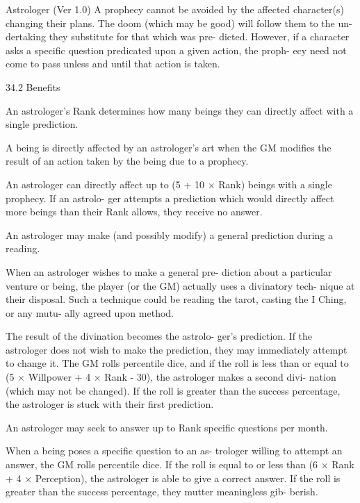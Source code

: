 \begin{Chapter}{Astrologer (Ver 1.0)}
A  prophecy  cannot  be  avoided  by  the  affected 
character(s)  changing 
their  plans.  The  doom 
(which  may  be  good)  will  follow  them  to  the  un-
dertaking  they  substitute  for  that  which  was  pre-
dicted.  However,  if  a  character  asks  a  specific 
question predicated upon a given action, the proph-
ecy  need  not  come  to  pass  unless  and  until  that 
action is taken. 

34.2 Benefits 

An  astrologer’s  Rank  determines  how  many 
beings  they  can  directly  affect  with  a  single 
prediction. 

A  being  is  directly  affected  by  an  astrologer’s  art 
when the GM modifies the result of an action taken 
by the being due to a prophecy. 

An  astrologer  can  directly  affect  up  to  (5  +  10  × 
Rank) beings with a single prophecy. If an astrolo-
ger  attempts  a  prediction  which  would  directly 
affect  more  beings  than  their  Rank  allows,  they 
receive no answer. 

An  astrologer  may  make  (and  possibly  modify) 
a general prediction during a reading. 

When an astrologer  wishes to make a general pre-
diction  about  a  particular  venture  or  being,  the 
player (or the GM) actually uses a divinatory tech-
nique  at  their  disposal.  Such  a  technique  could  be 
reading the tarot, casting the I Ching, or any mutu-
ally agreed upon method. 

The  result  of  the  divination  becomes  the  astrolo-
ger’s  prediction.  If  the  astrologer  does  not  wish to 
make the prediction, they may immediately attempt 
to  change  it.  The  GM  rolls  percentile  dice,  and  if 
the roll is less than or equal to (5 × Willpower + 4 
×  Rank  -  30),  the  astrologer  makes  a  second  divi-
nation  (which  may  not  be  changed).  If  the  roll  is 
greater  than  the  success  percentage,  the  astrologer 
is stuck with their first prediction. 

An  astrologer  may  seek  to  answer  up  to  Rank 
specific questions per month. 

When  a  being  poses  a  specific  question  to  an  as-
trologer willing to attempt an answer, the GM rolls 
percentile dice. If the roll is equal to or less than (6 
× Rank + 4 × Perception), the astrologer is able to 
give a correct answer. If the roll is greater than the 
success  percentage,  they  mutter  meaningless  gib-
berish. 


\end{Chapter}
